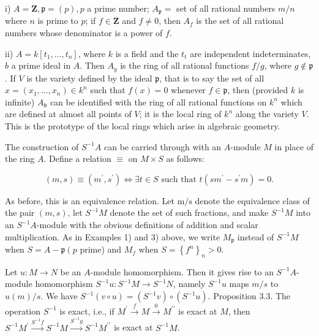 \documentclass{standalone}
\theoremstyle{definition}
\theoremstyle{remark}
\begin{document}
i) $A=\mathbf{Z}, \mathfrak{p}=(p), p$ a prime number; $A_{\mathfrak{p}}=$ set of all rational numbers $m / n$ where $n$ is prime to $p$; if $f \in \mathbf{Z}$ and $f \neq 0$, then $A_{f}$ is the set of all rational numbers whose denominator is a power of $f$.

ii) $A=k\left[t_{1}, \ldots, t_{n}\right]$, where $k$ is a field and the $t_{t}$ are independent indeterminates, $b$ a prime ideal in $A$. Then $A_{y}$ is the ring of all rational functions $f / g$, where $g \notin \mathfrak{p}$. If $V$ is the variety defined by the ideal $\mathfrak{p}$, that is to say the set of all $x=\left(x_{1}, \ldots, x_{n}\right) \in k^{n}$ such that $f(x)=0$ whenever $f \in \mathfrak{p}$, then (provided $k$ is infinite) $A_{\mathfrak{b}}$ can be identified with the ring of all rational functions on $k^{n}$ which are defined at almost all points of $V$; it is the local ring of $k^{n}$ along the variety $V$. This is the prototype of the local rings which arise in algebraic geometry.

The construction of $S^{-1} A$ can be carried through with an $A$-module $M$ in place of the ring $A$. Define a relation $\equiv$ on $M \times S$ as follows:

\[
(m, s) \equiv\left(m^{\prime}, s^{\prime}\right) \Leftrightarrow \exists t \in S \text { such that } t\left(s m^{\prime}-s^{\prime} m\right)=0 .
\]

As before, this is an equivalence relation. Let $\mathrm{m} / \mathrm{s}$ denote the equivalence class of the pair $(m, s)$, let $S^{-1} M$ denote the set of such fractions, and make $S^{-1} M$ into an $S^{-1} A$-module with the obvious definitions of addition and scalar multiplication. As in Examples 1) and 3) above, we write $M_{\mathfrak{p}}$ instead of $S^{-1} M$ when $S=A-\mathfrak{p}\left(p\right.$ prime) and $M_{f}$ when $S=\left\{f^{n}\right\}_{n}>0$.

Let $u: M \rightarrow N$ be an $A$-module homomorphism. Then it gives rise to an $S^{-1} A$-module homomorphism $S^{-1} u: S^{-1} M \rightarrow S^{-1} N$, namely $S^{-1} u$ maps $m / s$ to $u(m) / s$. We have $S^{-1}(v \circ u)=\left(S^{-1} v\right) \circ\left(S^{-1} u\right)$. Proposition 3.3. The operation $S^{-1}$ is exact, i.e., if $M^{\prime} \stackrel{f}{\rightarrow} M \stackrel{0}{\rightarrow} M^{\prime \prime}$ is exact at $M$, then $S^{-1} M^{\prime} \stackrel{S^{-1} f}{\longrightarrow} S^{-1} M \stackrel{S^{-1} g}{\longrightarrow} S^{-1} M^{\prime \prime}$ is exact at $S^{-1} M$.
\end{document}
